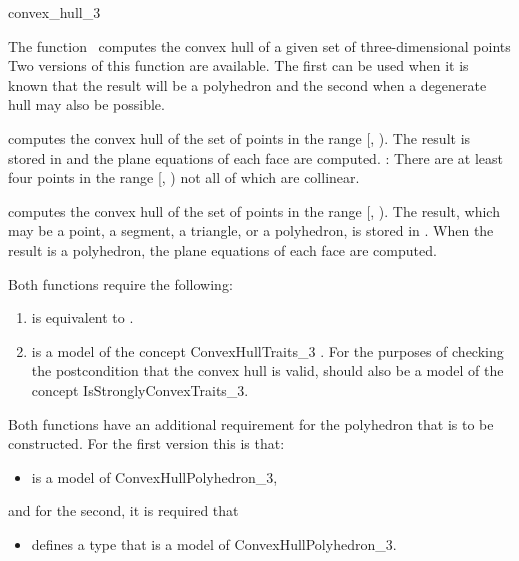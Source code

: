 \begin{ccRefFunction}{convex_hull_3}

\ccDefinition

The function \ccRefName\ computes the convex hull of a given set of 
three-dimensional points 
Two versions of this function 
are available.  The first can be used when it is known that the result
will be a polyhedron and the second when a degenerate hull
may also be possible.


{
computes the convex hull of the set of points in the range
[, ).  The result is stored in 
and the plane equations of each face are computed.
\ccPrecond: There are at least four points in the range 
[, ) not all of which are collinear.
}

{
computes the convex hull of the set of points in the range
[, ).  The result, which may be a point, a segment,
a triangle, or a polyhedron, is stored in .  When
the result is a polyhedron, the plane equations of each face are computed.
}

Both functions require the following:
\begin{enumerate}
   \item {} is equivalent to .
   \item {} is a model of the concept ConvexHullTraits\_3
         .
         For the purposes of checking the postcondition that the convex hull
         is valid,  should also be a model of the concept
         IsStronglyConvexTraits\_3.
\end{enumerate}

Both functions have an additional requirement for the polyhedron that is
to be constructed. For the first version this is that:
\begin{itemize}
  \item {} is a model of ConvexHullPolyhedron\_3,
\end{itemize}
and for the second, it is required that
\begin{itemize}
 \item {} defines a type  that is a model of 
       ConvexHullPolyhedron\_3.
\end{itemize}


\end{ccRefFunction}

